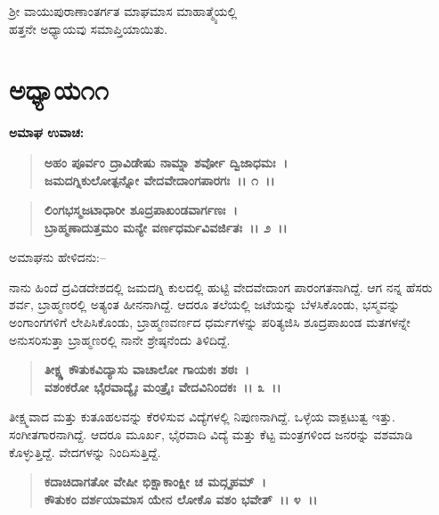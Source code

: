 \begin{center}
ಶ‍್ರೀ ವಾಯುಪುರಾಣಾಂತರ್ಗತ ಮಾಘಮಾಸ ಮಾಹಾತ್ಮ್ಯೆಯಲ್ಲಿ \\ ಹತ್ತನೇ ಅಧ್ಯಾಯವು ಸಮಾಪ್ತಿಯಾಯಿತು.
\end{center}

\newpage

\section*{ಅಧ್ಯಾಯ೧೧}

\emptypage

\begin{flushleft}
\textbf{ಅಮಾಘ ಉವಾಚ: }
\end{flushleft}

\begin{verse}
\textbf{ಅಹಂ ಪೂರ್ವಂ ದ್ರಾವಿಡೇಷು ನಾಮ್ನಾ ಶರ್ವೋ ದ್ವಿಜಾಧಮಃ~।}\\\textbf{ಜಮದಗ್ನಿಕುಲೋತ್ಪನ್ನೋ ವೇದವೇದಾಂಗಪಾರಗಃ~।। ೧~।।} 
\end{verse}

\begin{verse}
\textbf{ಲಿಂಗಭಸ್ಮಜಟಾಧಾರೀ ಶೂದ್ರಪಾಖಂಡವಾರ್ಗಣಃ~।}\\\textbf{ಬ್ರಾಹ್ಮಣಾದುತ್ತಮಂ ಮನ್ಯೇ ವರ್ಣಧರ್ಮವಿವರ್ಜಿತಃ~।। ೨~।।}
\end{verse}

\begin{flushleft}
ಅಮಾಘನು ಹೇಳಿದನು:–
\end{flushleft}

ನಾನು ಹಿಂದೆ ದ್ರವಿಡದೇಶದಲ್ಲಿ ಜಮದಗ್ನಿ ಕುಲದಲ್ಲಿ ಹುಟ್ಟಿ ವೇದವೇದಾಂಗ ಪಾರಂಗತನಾಗಿದ್ದೆ. ಆಗ ನನ್ನ ಹೆಸರು ಶರ್ವ, ಬ್ರಾಹ್ಮಣರಲ್ಲಿ ಅತ್ಯಂತ ಹೀನನಾಗಿದ್ದೆ. ಆದರೂ ತಲೆಯಲ್ಲಿ ಜಟೆಯನ್ನು ಬೆಳಸಿಕೊಂಡು, ಭಸ್ಮವನ್ನು ಅಂಗಾಂಗಗಳಿಗೆ ಲೇಪಿಸಿಕೊಂಡು, ಬ್ರಾಹ್ಮಣವರ್ಣದ ಧರ್ಮಗಳನ್ನು ಪರಿತ್ಯಜಿಸಿ ಶೂದ್ರಪಾಖಂಡ ಮತಗಳನ್ನೇ ಅನುಸರಿಸುತ್ತಾ ಬ್ರಾಹ್ಮಣರಲ್ಲಿ ನಾನೇ ಶ್ರೇಷ್ಠನೆಂದು ತಿಳಿದಿದ್ದೆ.

\begin{verse}
\textbf{ತೀಕ್ಷ್ಣ ಕೌತುಕವಿದ್ಯಾಸು ವಾಚಾಲೋ ಗಾಯಕಃ ಶಠಃ~।}\\\textbf{ವಶಂಕರೋ ಭೈರವಾದ್ಯೈಃ ಮಂತ್ರೈಃ ವೇದವಿನಿಂದಕಃ~।। ೩~।।}
\end{verse}

ತೀಕ್ಷ್ಮವಾದ ಮತ್ತು ಕುತೂಹಲವನ್ನು ಕೆರಳಿಸುವ ವಿದ್ಯೆಗಳಲ್ಲಿ ನಿಪುಣನಾಗಿದ್ದೆ. ಒಳ್ಳೆಯ ವಾಕ್ಪಟುತ್ವ ಇತ್ತು. ಸಂಗೀತಗಾರನಾಗಿದ್ದೆ. ಆದರೂ ಮೂರ್ಖ, ಭೈರವಾದಿ ವಿದ್ಯೆ ಮತ್ತು ಕೆಟ್ಟ ಮಂತ್ರಗಳಿಂದ ಜನರನ್ನು ವಶಮಾಡಿ ಕೊಳ್ಳುತ್ತಿದ್ದೆ. ವೇದಗಳನ್ನು ನಿಂದಿಸುತ್ತಿದ್ದೆ.

\begin{verse}
\textbf{ಕದಾಚಿದಾಗತೋ ವೇಷೀ ಭಿಕ್ಷಾಕಾಂಕ್ಷೀ ಚ ಮದ್ಗೃಹಮ್~।}\\\textbf{ಕೌತುಕಂ ದರ್ಶಯಾಮಾಸ ಯೇನ ಲೋಕೊ ವಶಂ ಭವೇತ್~।। ೪~।।}
\end{verse}


